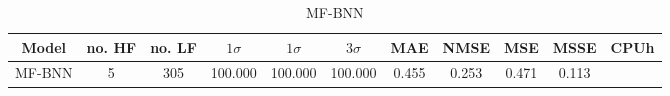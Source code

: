 \documentclass{article}
\begin{document}
\begin{table}[ht]
\centering
\begin{tabular}{|c|c|c|c|c|c|c|c|c|c|c|}
\hline
Model & no. HF & no. LF & $1\sigma$ & $1\sigma$ & $3\sigma$ & MAE & NMSE & MSE & MSSE & CPUh\\ \hline
MF-BNN & 5 & 305 & 100.000 & 100.000 & 100.000 & 0.455 & 0.253 & 0.471 & 0.113 &  \\ \hline
\end{tabular}
\caption{MF-BNN}
\label{tab:example}
\end{table}
\end{document}

